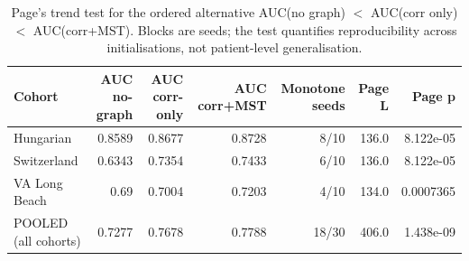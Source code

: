 \begin{table}[t]
\centering
\caption{Page's trend test for the ordered alternative AUC(no graph) $<$ AUC(corr only) $<$ AUC(corr+MST). Blocks are seeds; the test quantifies reproducibility across initialisations, not patient-level generalisation.}
\label{tab:msttrend}
\footnotesize
\begin{tabular}{lrrrrrr}
\toprule
Cohort & AUC no-graph & AUC corr-only & AUC corr+MST & Monotone seeds & Page L & Page p \\
\midrule
Hungarian & 0.8589 & 0.8677 & 0.8728 & 8/10 & 136.0 & 8.122e-05 \\
Switzerland & 0.6343 & 0.7354 & 0.7433 & 6/10 & 136.0 & 8.122e-05 \\
VA Long Beach & 0.69 & 0.7004 & 0.7203 & 4/10 & 134.0 & 0.0007365 \\
POOLED (all cohorts) & 0.7277 & 0.7678 & 0.7788 & 18/30 & 406.0 & 1.438e-09 \\
\bottomrule
\end{tabular}
\end{table}
